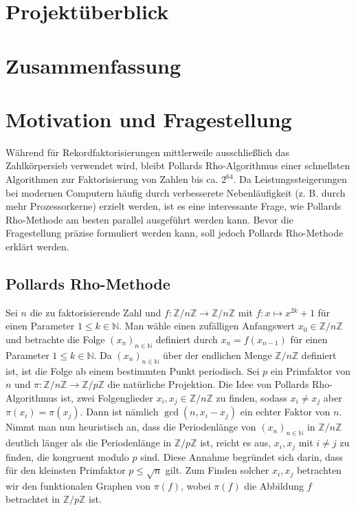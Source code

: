 \documentclass[a4paper, 10pt, ngerman]{article}
\title{\sffamily{\textbf{Parametrisierung von Pollards Rho-Methode}}}
\author{Finn Rudolph}
\date{03.01.2024}
\newcommand{\N}{\mathbb{N}}
\newcommand{\Z}{\mathbb{Z}}
\begin{document}
\maketitle

\section*{Projektüberblick}

\tableofcontents

\section{Zusammenfassung}

\section{Motivation und Fragestellung}

Während für Rekordfaktorisierungen mittlerweile ausschließlich das Zahlkörpersieb verwendet wird, bleibt Pollards Rho-Algorithmus einer schnellsten Algorithmen zur Faktorisierung von Zahlen bis ca. $2^{64}$. Da Leistungssteigerungen bei modernen Computern häufig durch verbesserete Nebenläufigkeit (z. B. durch mehr Prozessorkerne) erzielt werden, ist es eine interessante Frage, wie Pollards Rho-Methode am besten parallel ausgeführt werden kann. Bevor die Fragestellung präzise formuliert werden kann, soll jedoch Pollards Rho-Methode erklärt werden.

\subsection{Pollards Rho-Methode}

Sei $n$ die zu faktorisierende Zahl und $f : \Z/n\Z \to \Z/n\Z$ mit $f : x \mapsto x^{2k} + 1$ für einen Parameter $1 \le k \in \N$. Man wähle einen zufälligen Anfangswert $x_0 \in \Z/n\Z$ und betrachte die Folge $(x_n)_{n \in \N}$ definiert durch $x_n = f(x_{n - 1})$ für einen Parameter $1 \le k \in \N$. Da $(x_n)_{n \in \N}$ über der endlichen Menge $\Z/n\Z$ definiert ist, ist die Folge ab einem bestimmten Punkt periodisch. Sei $p$ ein Primfaktor von $n$ und $\pi : \Z/n\Z \to \Z/p\Z$ die natürliche Projektion. Die Idee von Pollards Rho-Algorithmus ist, zwei Folgenglieder $x_i, x_j \in \Z/n\Z$ zu finden, sodass $x_i \ne x_j$ aber $\pi(x_i) = \pi(x_j)$. Dann ist nämlich $\gcd(n, x_i - x_j)$ ein echter Faktor von $n$. Nimmt man nun heuristisch an, dass die Periodenlänge von $(x_n)_{n \in \N}$ in $\Z/n\Z$ deutlich länger als die Periodenlänge in $\Z/p\Z$ ist, reicht es aus, $x_i, x_j$ mit $i \ne j$ zu finden, die kongruent modulo $p$ sind. Diese Annahme begründet sich darin, dass für den kleinsten Primfaktor $p \le \sqrt n$ gilt. Zum Finden solcher $x_i, x_j$ betrachten wir den funktionalen Graphen von $\pi(f)$, wobei $\pi(f)$ die Abbildung $f$ betrachtet in $\Z/p\Z$ ist.
\end{document}
